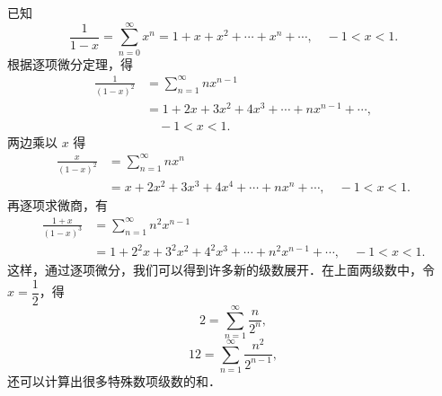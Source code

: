 \begin{example}\label{ex:13-3-3}
已知
\[
\frac{1}{1-x}=\sum_{n=0}^{\infty}x^{n}=1+x+x^{2}+\cdots+x^{n}+\cdots,\quad -1<x<1.
\]
根据逐项微分定理，得
\[
\begin{aligned}
\frac{1}{(1-x)^{2}}&=\sum_{n=1}^{\infty}nx^{n-1}\\
&=1+2x+3x^{2}+4x^{3}+\cdots+nx^{n-1}+\cdots,\\
&\quad -1<x<1.
\end{aligned}
\]
两边乘以 $x$ 得
\[
\begin{aligned}
\frac{x}{(1-x)^{2}}&=\sum_{n=1}^{\infty}nx^{n}\\
&=x+2x^{2}+3x^{3}+4x^{4}+\cdots+nx^{n}+\cdots,\quad -1<x<1.
\end{aligned}
\]
再逐项求微商，有
\[
\begin{aligned}
\frac{1+x}{(1-x)^{3}}&=\sum_{n=1}^{\infty}n^{2}x^{n-1}\\
&=1+2^{2}x+3^{2}x^{2}+4^{2}x^{3}+\cdots+n^{2}x^{n-1}+\cdots,\quad -1<x<1.
\end{aligned}
\]
这样，通过逐项微分，我们可以得到许多新的级数展开．在上面两级数中，令 $x=\dfrac{1}{2}$，得
\[
2=\sum_{n=1}^{\infty}\frac{n}{2^{n}},
\]
\[
12=\sum_{n=1}^{\infty}\frac{n^{2}}{2^{n-1}},
\]
还可以计算出很多特殊数项级数的和．
\end{example}

